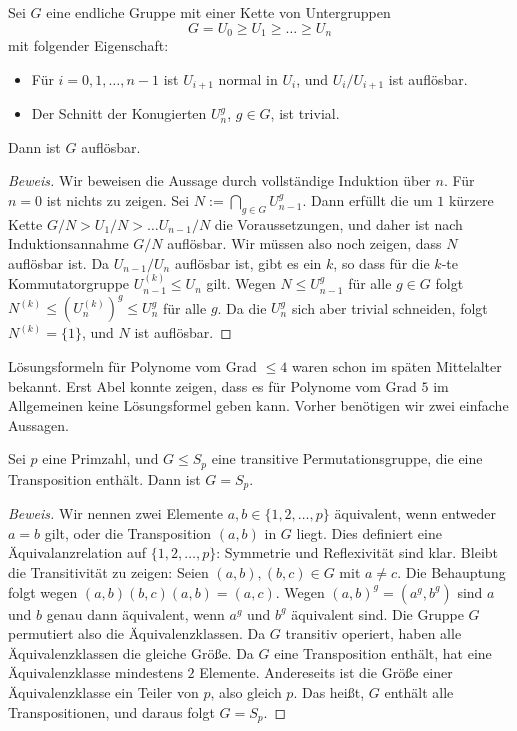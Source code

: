 \documentclass[12pt,a4paper,twoside]{article}
\begin{document}
\begin{Lemma}
  Sei $G$ eine endliche Gruppe mit einer Kette von Untergruppen
\[
G=U_0\ge U_1\ge \dots\ge U_n
\]
mit folgender Eigenschaft:
\begin{itemize}
\item[(a)] F\"ur $i=0,1,\dots,n-1$ ist $U_{i+1}$ normal in $U_i$, und
  $U_i/U_{i+1}$ ist aufl\"osbar.
\item[(b)] Der Schnitt der Konugierten $U_n^g$, $g\in G$, ist trivial.
\end{itemize}
Dann ist $G$ aufl\"osbar.
\end{Lemma}
\begin{proof}[Beweis]
  Wir beweisen die Aussage durch vollst\"andige Induktion \"uber $n$. F\"ur
  $n=0$ ist nichts zu zeigen. Sei $N:=\bigcap_{g\in G}U_{n-1}^g$. Dann
  erf\"ullt die um $1$ k\"urzere Kette $G/N>U_1/N>\dots U_{n-1}/N$ die
  Voraussetzungen, und daher ist nach Induktionsannahme $G/N$ aufl\"osbar. Wir
  m\"ussen also noch zeigen, dass $N$ aufl\"osbar ist. Da $U_{n-1}/U_n$
  aufl\"osbar ist, gibt es ein $k$, so dass f\"ur die $k$-te Kommutatorgruppe
  $U_{n-1}^{(k)}\le U_n$ gilt. Wegen $N\le U_{n-1}^g$ f\"ur alle $g\in G$
  folgt $N^{(k)}\le (U_{n}^{(k)})^g\le U_n^g$ f\"ur alle $g$. Da die $U_n^g$
  sich aber trivial schneiden, folgt $N^{(k)}=\{1\}$, und $N$ ist aufl\"osbar.
\end{proof}
L\"osungsformeln f\"ur Polynome vom Grad $\le4$ waren schon im sp\"aten
Mittelalter bekannt. Erst Abel konnte zeigen, dass es f\"ur Polynome vom Grad
$5$ im Allgemeinen keine L\"osungsformel geben kann. Vorher ben\"otigen wir
zwei einfache Aussagen.
\begin{Lemma}
  Sei $p$ eine Primzahl, und $G\le S_p$ eine transitive Permutationsgruppe,
  die eine Transposition enth\"alt. Dann ist $G=S_p$.
\end{Lemma}
\begin{proof}[Beweis]
  Wir nennen zwei Elemente $a,b\in\{1,2,\dots,p\}$ \"aquivalent, wenn entweder
  $a=b$ gilt, oder die Transposition $(a,b)$ in $G$ liegt. Dies definiert eine
  \"Aquivalanzrelation auf $\{1,2,\dots,p\}$: Symmetrie und Reflexivit\"at
  sind klar. Bleibt die Transitivit\"at zu zeigen: Seien $(a,b),(b,c)\in G$
  mit $a\ne c$. Die Behauptung folgt wegen $(a,b)(b,c)(a,b)=(a,c)$. Wegen
  $(a,b)^g=(a^g,b^g)$ sind $a$ und $b$ genau dann \"aquivalent, wenn $a^g$ und
  $b^g$ \"aquivalent sind. Die Gruppe $G$ permutiert also die
  \"Aquivalenzklassen. Da $G$ transitiv operiert, haben alle
  \"Aquivalenzklassen die gleiche Gr\"o\ss e. Da $G$ eine Transposition
  enth\"alt, hat eine \"Aquivalenzklasse mindestens $2$ Elemente. Andereseits
  ist die Gr\"o\ss e einer \"Aquivalenzklasse ein Teiler von $p$, also gleich
  $p$. Das hei\ss t, $G$ enth\"alt alle Transpositionen, und daraus folgt
  $G=S_p$.
\end{proof}
\end{document}
